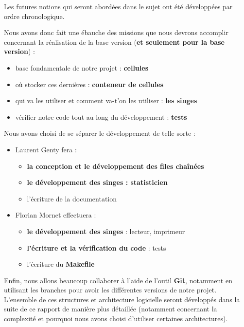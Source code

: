 \documentclass{article}
\begin{document}
Les futures notions qui seront abordées dans le sujet ont été développées par ordre chronologique.

Nous avons donc fait une ébauche des missions que nous devrons accomplir concernant la réalisation de la base version (\textbf{et seulement pour la base version}) :
\begin{itemize}
    \item base fondamentale de notre projet : \textbf{cellules}
    \item où stocker ces dernières : \textbf{conteneur de cellules}
    \item qui va les utiliser et comment va-t'on les utiliser : \textbf{les singes}
    \item vérifier notre code tout au long du développement : \textbf{tests}
\end{itemize}
Nous avons choisi de se séparer le développement de telle sorte :
\begin{itemize}
    \item Laurent Genty fera :
        \begin{itemize}
            \item \textbf{la conception et le développement des files chaînées}
            \item \textbf{le développement des singes : statisticien}
            \item l'écriture de la documentation
        \end{itemize}
    \item Florian Mornet effectuera :
        \begin{itemize}
            \item \textbf{le développement des singes} : lecteur, imprimeur
            \item \textbf{l'écriture et la vérification du code} : tests
            \item l'écriture du \textbf{Makefile}
        \end{itemize}
\end{itemize}

Enfin, nous allons beaucoup collaborer à l'aide de l'outil \textbf{Git}, notamment en utilisant les branches pour avoir les différentes versions de notre projet. 
L'ensemble de ces structures et architecture logicielle seront développés dans la suite de ce rapport de manière plus détaillée (notamment concernant la complexité et pourquoi nous avons choisi d'utiliser certaines architectures).

\end{document}

